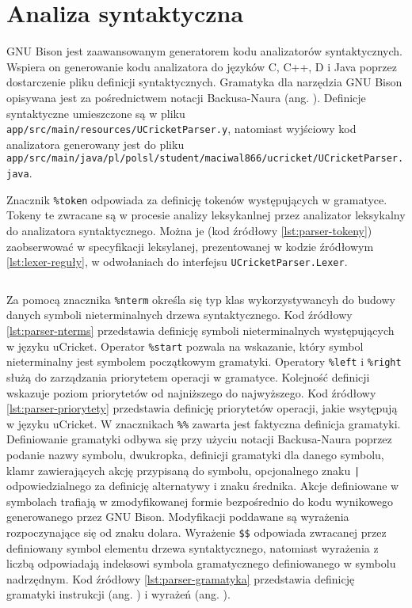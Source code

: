 \section{Analiza syntaktyczna}
GNU Bison jest zaawansowanym generatorem kodu analizatorów syntaktycznych. Wspiera on generowanie kodu analizatora do języków C, C++, D i Java poprzez dostarczenie pliku definicji syntaktycznych. Gramatyka dla narzędzia GNU Bison opisywana jest za pośrednictwem notacji Backusa-Naura (ang. ). Definicje syntaktyczne umieszczone są w pliku \lstinline|app/src/main/resources/UCricketParser.y|, natomiast wyjściowy kod analizatora generowany jest do pliku \lstinline|app/src/main/java/pl/polsl/student/maciwal866/ucricket/UCricketParser.java|.

Znacznik \lstinline|%token| odpowiada za definicję tokenów występujących w gramatyce. Tokeny te zwracane są w procesie analizy leksykanlnej przez analizator leksykalny do analizatora syntaktycznego. Można je (kod źródłowy \ref{lst:parser-tokeny}) zaobserwować w specyfikacji leksylanej, prezentowanej w kodzie źródłowym \ref{lst:lexer-reguły}, w odwołaniach do interfejsu \lstinline|UCricketParser.Lexer|.
\begin{lstlisting}[caption={Definicja tokentów w analizatorze syntaktycznym}, label={lst:parser-tokeny}]
%token IDENTIFIER INTEGER FLOAT IMPORT SCOPE IF WHILE FUNC VAR PTR RETURN TRUE FALSE EQUAL_EQUAL BANG_EQUAL LESS_EQUAL GREATER_EQUAL ASSIGN_ADDRESS
\end{lstlisting} 
Za pomocą znacznika \lstinline|%nterm| określa się typ klas wykorzystywancyh do budowy danych symboli nieterminalnych drzewa syntaktycznego. Kod źródłowy \ref{lst:parser-nterms} przedstawia definicję symboli nieterminalnych występujących w języku uCricket.
Operator \lstinline|%start| pozwala na wskazanie, który symbol nieterminalny jest symbolem początkowym gramatyki.
Operatory \lstinline|%left| i \lstinline|%right| służą do zarządzania priorytetem operacji w gramatyce. Kolejność definicji wskazuje poziom priorytetów od najniższego do najwyższego. Kod źródłowy \ref{lst:parser-priorytety} przedstawia definicję priorytetów operacji, jakie wsytępują w języku uCricket.
W znacznikach \lstinline|%%| zawarta jest faktyczna definicja gramatyki. Definiowanie gramatyki odbywa się przy użyciu notacji Backusa-Naura poprzez podanie nazwy symbolu, dwukropka, definicji gramatyki dla danego symbolu, klamr zawierających akcję przypisaną do symbolu, opcjonalnego znaku \lstinline/|/ odpowiedzialnego za definicję alternatywy i znaku średnika. Akcje definiowane w symbolach trafiają w zmodyfikowanej formie bezpośrednio do kodu wynikowego generowanego przez GNU Bison. Modyfikacji poddawane są wyrażenia rozpoczynające się od znaku dolara. Wyrażenie \lstinline|$$| odpowiada zwracanej przez definiowany symbol elementu drzewa syntaktycznego, natomiast wyrażenia z liczbą odpowiadają indeksowi symbola gramatycznego definiowanego w symbolu nadrzędnym. Kod źródłowy \ref{lst:parser-gramatyka} przedstawia definicję gramatyki instrukcji (ang. ) i wyrażeń (ang. ).

